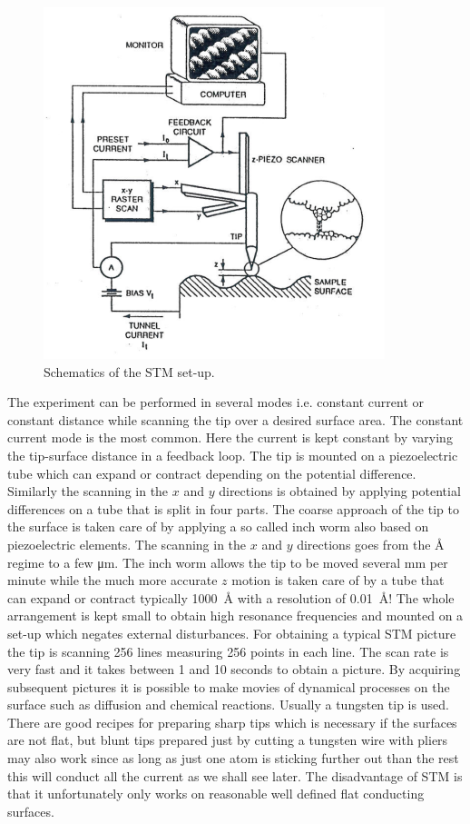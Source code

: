 \begin{figure}[h!]
	\begin{center}
	\includegraphics[scale=4]{figures/10_01.png}
	\caption{Schematics of the STM set-up.}
	\label{fig:stmsetup}
	\end{center}
\end{figure}

The experiment can be performed in several modes i.e. constant current or constant distance while scanning the tip over a desired surface area. The constant current mode is the most common. Here the current is kept constant by varying the tip-surface distance in a feedback loop. The tip is mounted on a piezoelectric tube which can expand or contract depending on the potential difference. Similarly the scanning in the $x$ and $y$ directions is obtained by applying potential differences on a tube that is split in four parts. The coarse approach of the tip to the surface is taken care of by applying a so called inch worm also based on piezoelectric elements. The scanning in the $x$ and $y$ directions goes from the \si{\angstrom} regime to a few \si{\micro m}. The inch worm allows the tip to be moved several \si{mm} per minute while the much more accurate $z$ motion is taken care of by a tube that can expand or contract typically \SI{1000}{\angstrom} with a resolution of \SI{.01}{\angstrom}! The whole arrangement is kept small to obtain high resonance frequencies and mounted on a set-up which negates external disturbances. For obtaining a typical STM picture the tip is scanning 256 lines measuring 256 points in each line. The scan rate is very fast and it takes between 1 and 10 seconds to obtain a picture. By acquiring subsequent pictures it is possible to make movies of dynamical processes on the surface such as diffusion and chemical reactions. Usually a tungsten tip is used. There are good recipes for preparing sharp tips which is necessary if the surfaces are not flat, but blunt tips prepared just by cutting a tungsten wire with pliers may also work since as long as just one atom is sticking further out than the rest this will conduct all the current as we shall see later. The disadvantage of STM is  that it unfortunately only works on reasonable well defined flat conducting surfaces.

